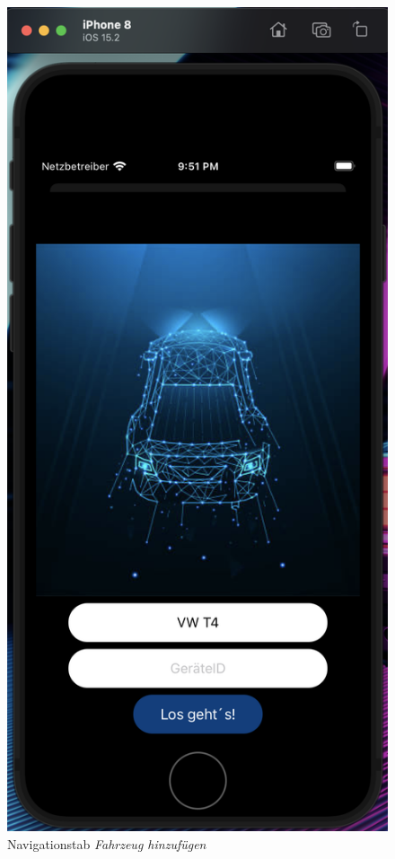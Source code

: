 \begin{figure} [H]
	\begin{center}
		\includegraphics[width=1\textwidth]{Bilder/iOS_addDevice.png}
		\caption{Navigationstab \textit{Fahrzeug hinzufügen}}
		\label{add}
	\end{center}
\end{figure}

